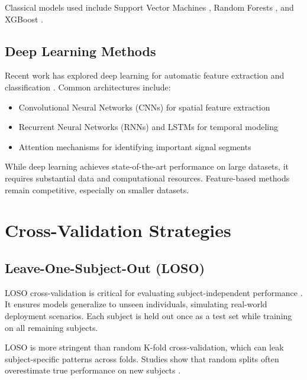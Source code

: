 Classical models used include Support Vector Machines \cite{TODO_ADD_SVM_REF}, Random Forests \cite{TODO_ADD_RF_REF}, and XGBoost \cite{TODO_ADD_XGBOOST_REF}.

\subsection{Deep Learning Methods}
\label{subsec:deep_learning}

Recent work has explored deep learning for automatic feature extraction and classification \cite{TODO_ADD_DL_REFS}. Common architectures include:

\begin{itemize}
    \item Convolutional Neural Networks (CNNs) for spatial feature extraction
    \item Recurrent Neural Networks (RNNs) and LSTMs for temporal modeling
    \item Attention mechanisms for identifying important signal segments
\end{itemize}

While deep learning achieves state-of-the-art performance on large datasets, it requires substantial data and computational resources. Feature-based methods remain competitive, especially on smaller datasets.


\section{Cross-Validation Strategies}
\label{sec:cross_validation}

\subsection{Leave-One-Subject-Out (LOSO)}
\label{subsec:loso}

LOSO cross-validation is critical for evaluating subject-independent performance \cite{TODO_ADD_LOSO_REF}. It ensures models generalize to unseen individuals, simulating real-world deployment scenarios. Each subject is held out once as a test set while training on all remaining subjects.

LOSO is more stringent than random K-fold cross-validation, which can leak subject-specific patterns across folds. Studies show that random splits often overestimate true performance on new subjects \cite{TODO_ADD_REF}.

